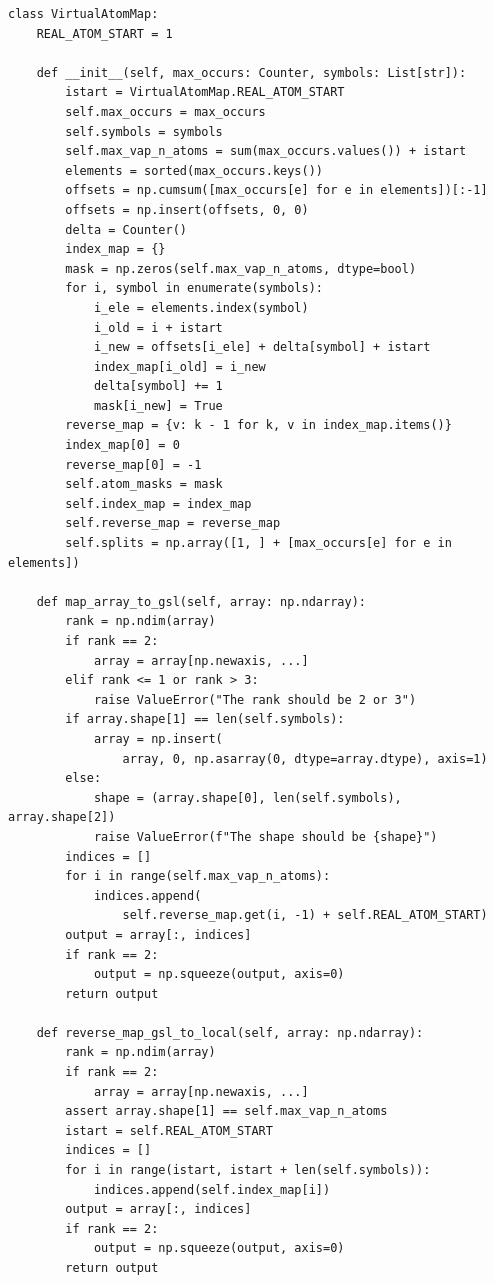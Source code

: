 \documentclass[final,1p,times]{elsarticle}
\begin{document}
\begin{verbatim}
class VirtualAtomMap:
    REAL_ATOM_START = 1

    def __init__(self, max_occurs: Counter, symbols: List[str]):
        istart = VirtualAtomMap.REAL_ATOM_START
        self.max_occurs = max_occurs
        self.symbols = symbols
        self.max_vap_n_atoms = sum(max_occurs.values()) + istart
        elements = sorted(max_occurs.keys())
        offsets = np.cumsum([max_occurs[e] for e in elements])[:-1]
        offsets = np.insert(offsets, 0, 0)
        delta = Counter()
        index_map = {}
        mask = np.zeros(self.max_vap_n_atoms, dtype=bool)
        for i, symbol in enumerate(symbols):
            i_ele = elements.index(symbol)
            i_old = i + istart
            i_new = offsets[i_ele] + delta[symbol] + istart
            index_map[i_old] = i_new
            delta[symbol] += 1
            mask[i_new] = True
        reverse_map = {v: k - 1 for k, v in index_map.items()}
        index_map[0] = 0
        reverse_map[0] = -1
        self.atom_masks = mask
        self.index_map = index_map
        self.reverse_map = reverse_map
        self.splits = np.array([1, ] + [max_occurs[e] for e in elements])

    def map_array_to_gsl(self, array: np.ndarray):
        rank = np.ndim(array)
        if rank == 2:
            array = array[np.newaxis, ...]
        elif rank <= 1 or rank > 3:
            raise ValueError("The rank should be 2 or 3")
        if array.shape[1] == len(self.symbols):
            array = np.insert(
                array, 0, np.asarray(0, dtype=array.dtype), axis=1)
        else:
            shape = (array.shape[0], len(self.symbols), array.shape[2])
            raise ValueError(f"The shape should be {shape}")
        indices = []
        for i in range(self.max_vap_n_atoms):
            indices.append(
                self.reverse_map.get(i, -1) + self.REAL_ATOM_START)
        output = array[:, indices]
        if rank == 2:
            output = np.squeeze(output, axis=0)
        return output

    def reverse_map_gsl_to_local(self, array: np.ndarray):
        rank = np.ndim(array)
        if rank == 2:
            array = array[np.newaxis, ...]
        assert array.shape[1] == self.max_vap_n_atoms
        istart = self.REAL_ATOM_START
        indices = []
        for i in range(istart, istart + len(self.symbols)):
            indices.append(self.index_map[i])
        output = array[:, indices]
        if rank == 2:
            output = np.squeeze(output, axis=0)
        return output
\end{verbatim}
\end{document}
